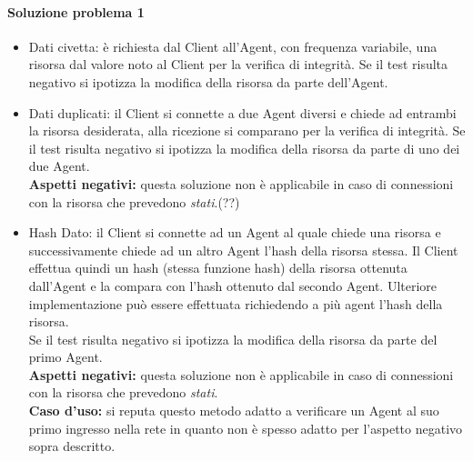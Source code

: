 	\paragraph{Soluzione problema 1}
	\begin{itemize}
		\item Dati civetta: è richiesta dal Client all'Agent, con frequenza variabile, una risorsa dal valore noto al Client per la verifica di integrità. Se il test risulta negativo si ipotizza la modifica della risorsa da parte dell'Agent.
		\item Dati duplicati: il Client si connette a due Agent diversi e chiede ad entrambi la risorsa desiderata, alla ricezione si comparano per la verifica di integrità. Se il test risulta negativo si ipotizza la modifica della risorsa da parte di uno dei due Agent.\\
		\textbf{Aspetti negativi:} questa soluzione non è applicabile in caso di connessioni con la risorsa che prevedono \textit{stati}.(??)
		\item Hash Dato: il Client si connette ad un Agent al quale chiede una risorsa e successivamente chiede ad un altro Agent l'hash della risorsa stessa. Il Client effettua quindi un hash (stessa funzione hash) della risorsa ottenuta dall'Agent e la compara con l'hash ottenuto dal secondo Agent. Ulteriore implementazione può essere effettuata richiedendo a più agent l'hash della risorsa.\\
		Se il test risulta negativo si ipotizza la modifica della risorsa da parte del primo Agent.\\
		\textbf{Aspetti negativi:} questa soluzione non è applicabile in caso di connessioni con la risorsa che prevedono \textit{stati}.\\
		\textbf{Caso d'uso:} si reputa questo metodo adatto a verificare un Agent al suo primo ingresso nella rete in quanto non è spesso adatto per l'aspetto negativo sopra descritto.		
	\end{itemize}
	
